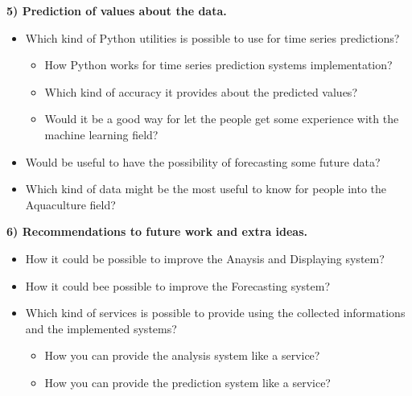 \textbf{5) Prediction of values about the data.}
\vspace{-5mm}
\begin{itemize}
 \setlength{\itemsep}{-5pt} 
  \item Which kind of Python utilities is possible to use for time series predictions?
  		\vspace{-3mm}
		\begin{itemize}
 		\setlength{\itemsep}{-5pt}	
		  \item How Python works for time series prediction systems implementation?
		  \item Which kind of accuracy it provides about the predicted values?
		  \item Would it be a good way for let the people get some experience with the machine learning field? 
		\end{itemize}
  \item Would be useful to have the possibility of forecasting some future data? 
  \item Which kind of data might be the most useful to know for people into the Aquaculture field?
	
 \end{itemize}

\textbf{6) Recommendations to future work and extra ideas.}
\vspace{-5mm}
\begin{itemize}
\setlength{\itemsep}{-5pt}
	\item How it could be possible to improve the Anaysis and Displaying system?
	\item How it could bee possible to improve the Forecasting system?
	\item Which kind of services is possible to provide using the collected informations and the implemented systems?
  		\vspace{-3mm}
		\begin{itemize}
 		\setlength{\itemsep}{-5pt}	
		  	\item How you can provide the analysis system like a service?
		  	\item How you can provide the prediction system like a service?
		\end{itemize}
 \end{itemize}




